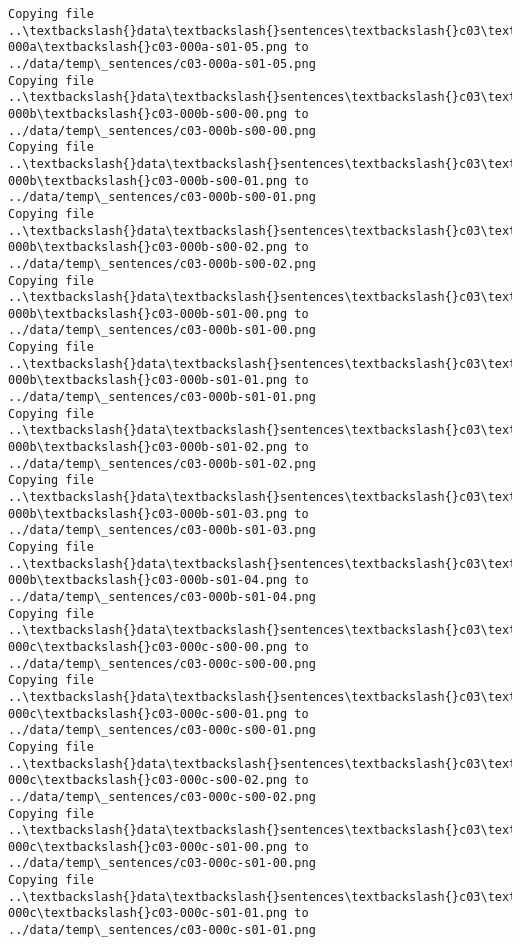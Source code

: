 \documentclass[11pt]{article}
\begin{document}
\begin{Verbatim}[commandchars=\\\{\}]
Copying file ..\textbackslash{}data\textbackslash{}sentences\textbackslash{}c03\textbackslash{}c03-000a\textbackslash{}c03-000a-s01-05.png to
../data/temp\_sentences/c03-000a-s01-05.png
Copying file ..\textbackslash{}data\textbackslash{}sentences\textbackslash{}c03\textbackslash{}c03-000b\textbackslash{}c03-000b-s00-00.png to
../data/temp\_sentences/c03-000b-s00-00.png
Copying file ..\textbackslash{}data\textbackslash{}sentences\textbackslash{}c03\textbackslash{}c03-000b\textbackslash{}c03-000b-s00-01.png to
../data/temp\_sentences/c03-000b-s00-01.png
Copying file ..\textbackslash{}data\textbackslash{}sentences\textbackslash{}c03\textbackslash{}c03-000b\textbackslash{}c03-000b-s00-02.png to
../data/temp\_sentences/c03-000b-s00-02.png
Copying file ..\textbackslash{}data\textbackslash{}sentences\textbackslash{}c03\textbackslash{}c03-000b\textbackslash{}c03-000b-s01-00.png to
../data/temp\_sentences/c03-000b-s01-00.png
Copying file ..\textbackslash{}data\textbackslash{}sentences\textbackslash{}c03\textbackslash{}c03-000b\textbackslash{}c03-000b-s01-01.png to
../data/temp\_sentences/c03-000b-s01-01.png
Copying file ..\textbackslash{}data\textbackslash{}sentences\textbackslash{}c03\textbackslash{}c03-000b\textbackslash{}c03-000b-s01-02.png to
../data/temp\_sentences/c03-000b-s01-02.png
Copying file ..\textbackslash{}data\textbackslash{}sentences\textbackslash{}c03\textbackslash{}c03-000b\textbackslash{}c03-000b-s01-03.png to
../data/temp\_sentences/c03-000b-s01-03.png
Copying file ..\textbackslash{}data\textbackslash{}sentences\textbackslash{}c03\textbackslash{}c03-000b\textbackslash{}c03-000b-s01-04.png to
../data/temp\_sentences/c03-000b-s01-04.png
Copying file ..\textbackslash{}data\textbackslash{}sentences\textbackslash{}c03\textbackslash{}c03-000c\textbackslash{}c03-000c-s00-00.png to
../data/temp\_sentences/c03-000c-s00-00.png
Copying file ..\textbackslash{}data\textbackslash{}sentences\textbackslash{}c03\textbackslash{}c03-000c\textbackslash{}c03-000c-s00-01.png to
../data/temp\_sentences/c03-000c-s00-01.png
Copying file ..\textbackslash{}data\textbackslash{}sentences\textbackslash{}c03\textbackslash{}c03-000c\textbackslash{}c03-000c-s00-02.png to
../data/temp\_sentences/c03-000c-s00-02.png
Copying file ..\textbackslash{}data\textbackslash{}sentences\textbackslash{}c03\textbackslash{}c03-000c\textbackslash{}c03-000c-s01-00.png to
../data/temp\_sentences/c03-000c-s01-00.png
Copying file ..\textbackslash{}data\textbackslash{}sentences\textbackslash{}c03\textbackslash{}c03-000c\textbackslash{}c03-000c-s01-01.png to
../data/temp\_sentences/c03-000c-s01-01.png

\end{Verbatim}
\end{document}
